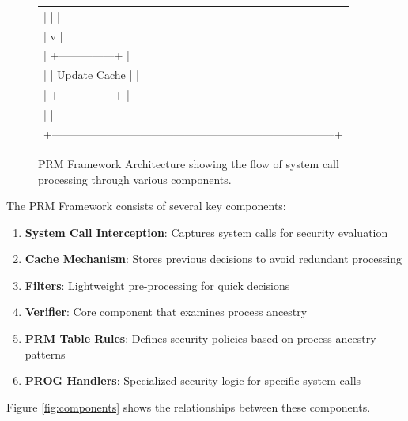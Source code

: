 \begin{figure}[htbp]
{{{\begin{tabular}{l}
|                     |                                                       | \\
|                     v                                                       | \\
|             +---------------+                                               | \\
|             | Update Cache  |                                               | \\
|             +---------------+                                               | \\
|                                                                             | \\
+-----------------------------------------------------------------------------+ \\
\end{tabular}
}
}}
\caption{PRM Framework Architecture showing the flow of system call processing through various components.}
\label{fig:architecture}
\end{figure}

The PRM Framework consists of several key components:

\begin{enumerate}
\item \textbf{System Call Interception}: Captures system calls for security evaluation
\item \textbf{Cache Mechanism}: Stores previous decisions to avoid redundant processing
\item \textbf{Filters}: Lightweight pre-processing for quick decisions
\item \textbf{Verifier}: Core component that examines process ancestry
\item \textbf{PRM Table Rules}: Defines security policies based on process ancestry patterns
\item \textbf{PROG Handlers}: Specialized security logic for specific system calls
\end{enumerate}

Figure \ref{fig:components} shows the relationships between these components.

